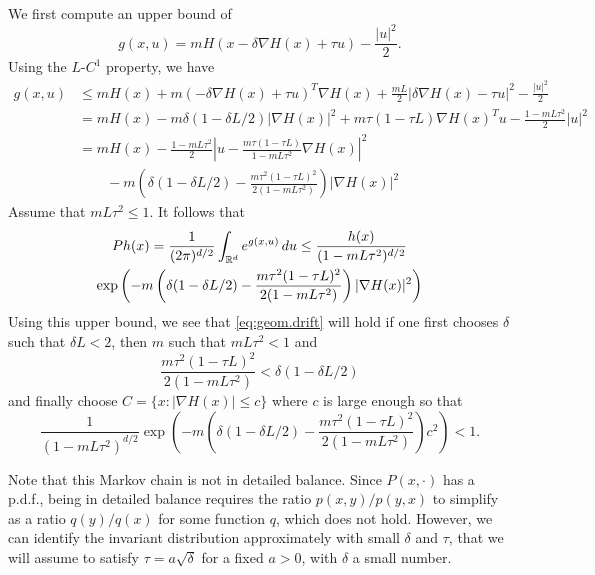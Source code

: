 We first compute an upper bound of
\[
g(x, u) = m H(x  -\delta \nabla H(x) + \tau u) - \frac{ |u|^2}2.
\]
Using the $L$-$C^1$ property, we have
\begin{align*}
g(x,u) &\leq mH(x) +m (-\delta\nabla H(x) + \tau u)^T \nabla H(x) + \frac{mL}{2}|\delta\nabla H(x) - \tau u|^2 - \frac{ |u|^2}2\\
& = m H(x) - m\delta( 1 - \delta L/2)|\nabla H(x)|^2 + m\tau (1 - \tau L)\nabla H(x)^T u - \frac{1 - mL\tau^2}{2} |u|^2 \\
&= m H(x)  - \frac{1 - mL\tau^2}{2} \left|u - \frac{m\tau (1-\tau L)}{1-mL\tau^2}\nabla H(x)\right|^2\\
& \qquad -m\left(\delta( 1 - \delta L/2) - \frac{m\tau^2 (1-\tau L)^2}{2(1-mL\tau^2)}\right)|\nabla H(x)|^2
\end{align*}
Assume that $mL\tau^2 \leq 1$.
It follows that
\begin{multline*}
Ph(x) = \frac{1}{(2\pi)^{d/2}}\int_{{\mathbb{R}}^d} e^{g(x,u)}\, du \leq \frac{h(x)}{(1 - mL\tau^2)^{d/2}}\\
 \exp\left( -m\left(\delta( 1 - \delta L/2) - \frac{m\tau^2 (1-\tau L)^2}{2(1-mL\tau^2)}\right)|\nabla H(x)|^2\right)
 \end{multline*}
Using this upper bound, we see that \cref{eq:geom.drift} will hold if one first chooses $\delta$ such that $\delta L < 2$, then $m$ such that $mL\tau^2 < 1$ and 
\[
\frac{m\tau^2 (1-\tau L)^2}{2(1-mL\tau^2)} < \delta( 1 - \delta L/2)
\]
and finally choose $C = \{x: |\nabla H(x)| \leq c\}$ where $c$ is large enough so that 
\[
\frac{1}{(1 - mL\tau^2)^{d/2}}
 \exp\left( -m\left(\delta( 1 - \delta L/2) - \frac{m\tau^2 (1-\tau L)^2}{2(1-mL\tau^2)}\right) c^2\right) < 1.
 \]
 
 Note that this Markov chain is not in detailed balance. Since $P(x, \cdot)$ has a p.d.f., being in detailed balance  requires the ratio $p(x,y)/p(y,x)$ to simplify as a ratio $q(y)/q(x)$ for some function $q$, which does not hold. However, we can identify the invariant distribution approximately with small $\delta$ and $\tau$, that we will assume to satisfy $\tau = a\sqrt{\delta}$ for a fixed $a >0$, with $\delta$ a small number.
 
